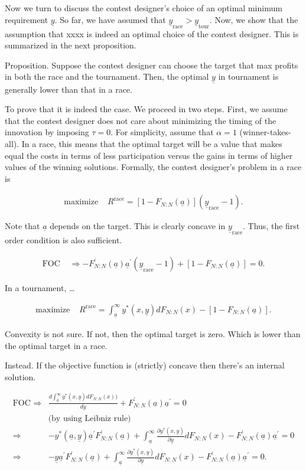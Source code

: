\documentclass[12pt,]{article}
\newcommand\target{\underline{y}}
\newcommand\race{\text{race}}
\newcommand\tournament{\text{tour}}
\newcommand\mtype{\underline{a}}
\newcommand\dystar{\frac{\partial y^*(x,\target)}{\partial\target}dF_{N:N}(x)}
\begin{document}
Now we turn to discuss the contest designer's choice of an optimal
minimum requirement \(\target\). So far, we have assumed that
\(\target_\race>\target_\tournament\). Now, we show that the assumption
that xxxx is indeed an optimal choice of the contest designer. This is
summarized in the next proposition.

Proposition. Suppose the contest designer can choose the target that max
profits in both the race and the tournament. Then, the optimal
\(\target\) in tournament is generally lower than that in a race.

To prove that it is indeed the case. We proceed in two steps. First, we
assume that the contest designer does not care about minimizing the
timing of the innovation by imposing \(\tau = 0\). For simplicity,
assume that \(\alpha=1\) (winner-takes-all). In a race, this means that
the optimal target will be a value that makes equal the costs in terms
of less participation versus the gains in terms of higher values of the
winning solutions. Formally, the contest designer's problem in a race is

\begin{align}
  \text{maximize } & R^\race = [1-F_{N:N}(\mtype)] (\target_\race - 1).
\end{align}

Note that \(\mtype\) depends on the target. This is clearly concave in
\(\target_\race\). Thus, the first order condition is also sufficient.

\begin{align}\label{foc race}
  \text{FOC } & \Rightarrow -F^\prime_{N:N}(\mtype) \mtype^\prime (\target_\race - 1) + [1-F_{N:N}(\mtype)] = 0.
\end{align}

In a tournament, \ldots{}

\begin{align}
  \text{maximize } & R^\race = \int_{\mtype}^\infty y^*(x, \target) d F_{N:N}(x) - [1-F_{N:N}(\mtype)]. 
\end{align}

Convexity is not sure. If not, then the optimal target is zero. Which is
lower than the optimal target in a race.

Instead. If the objective function is (strictly) concave then there's an
internal solution.

\begin{align} \label{foc tournament}
  \text{FOC } \Rightarrow & 
    \frac{d\int_{\mtype}^\infty y^*(x, \target) d F_{N:N}(x)) }{d \target}
      + F^\prime_{N:N}(\mtype) \mtype^\prime =0 \nonumber\\ 
    & \text{(by using Leibniz rule)}\nonumber\\
  \Rightarrow & - y^*(\mtype, \target) \mtype^\prime F^\prime_{N:N}(\mtype) 
      + \int_{\mtype}^\infty \dystar - F^\prime_{N:N}(\mtype) \mtype^\prime = 0\nonumber\\
  \Rightarrow & -\target \mtype^\prime F^\prime_{N:N}(\mtype) 
      + \int_{\mtype}^\infty \dystar - F^\prime_{N:N}(\mtype) \mtype^\prime = 0.
\end{align}
\end{document}
